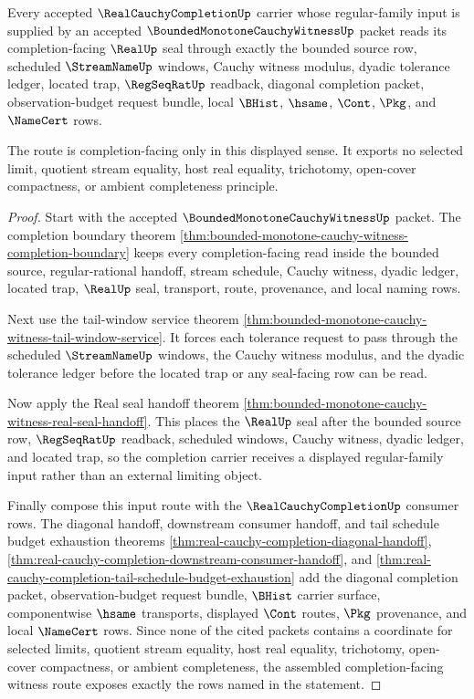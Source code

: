 \begin{theorem}
\label{thm:real-cauchy-completion-bounded-monotone-witness-consumer}
Every accepted $\RealCauchyCompletionUp$ carrier whose regular-family input is supplied by an accepted $\BoundedMonotoneCauchyWitnessUp$ packet reads its completion-facing $\RealUp$ seal through exactly the bounded source row, scheduled $\StreamNameUp$ windows, Cauchy witness modulus, dyadic tolerance ledger, located trap, $\RegSeqRatUp$ readback, diagonal completion packet, observation-budget request bundle, local $\BHist$, $\hsame$, $\Cont$, $\Pkg$, and $\NameCert$ rows.

The route is completion-facing only in this displayed sense. It exports no selected limit, quotient stream equality, host real equality, trichotomy, open-cover compactness, or ambient completeness principle.
\end{theorem}
\begin{proof}
Start with the accepted $\BoundedMonotoneCauchyWitnessUp$ packet. The completion boundary theorem \autoref{thm:bounded-monotone-cauchy-witness-completion-boundary} keeps every completion-facing read inside the bounded source, regular-rational handoff, stream schedule, Cauchy witness, dyadic ledger, located trap, $\RealUp$ seal, transport, route, provenance, and local naming rows.

Next use the tail-window service theorem \autoref{thm:bounded-monotone-cauchy-witness-tail-window-service}. It forces each tolerance request to pass through the scheduled $\StreamNameUp$ windows, the Cauchy witness modulus, and the dyadic tolerance ledger before the located trap or any seal-facing row can be read.

Now apply the Real seal handoff theorem \autoref{thm:bounded-monotone-cauchy-witness-real-seal-handoff}. This places the $\RealUp$ seal after the bounded source row, $\RegSeqRatUp$ readback, scheduled windows, Cauchy witness, dyadic ledger, and located trap, so the completion carrier receives a displayed regular-family input rather than an external limiting object.

Finally compose this input route with the $\RealCauchyCompletionUp$ consumer rows. The diagonal handoff, downstream consumer handoff, and tail schedule budget exhaustion theorems \autoref{thm:real-cauchy-completion-diagonal-handoff}, \autoref{thm:real-cauchy-completion-downstream-consumer-handoff}, and \autoref{thm:real-cauchy-completion-tail-schedule-budget-exhaustion} add the diagonal completion packet, observation-budget request bundle, $\BHist$ carrier surface, componentwise $\hsame$ transports, displayed $\Cont$ routes, $\Pkg$ provenance, and local $\NameCert$ rows. Since none of the cited packets contains a coordinate for selected limits, quotient stream equality, host real equality, trichotomy, open-cover compactness, or ambient completeness, the assembled completion-facing witness route exposes exactly the rows named in the statement.
\end{proof}

